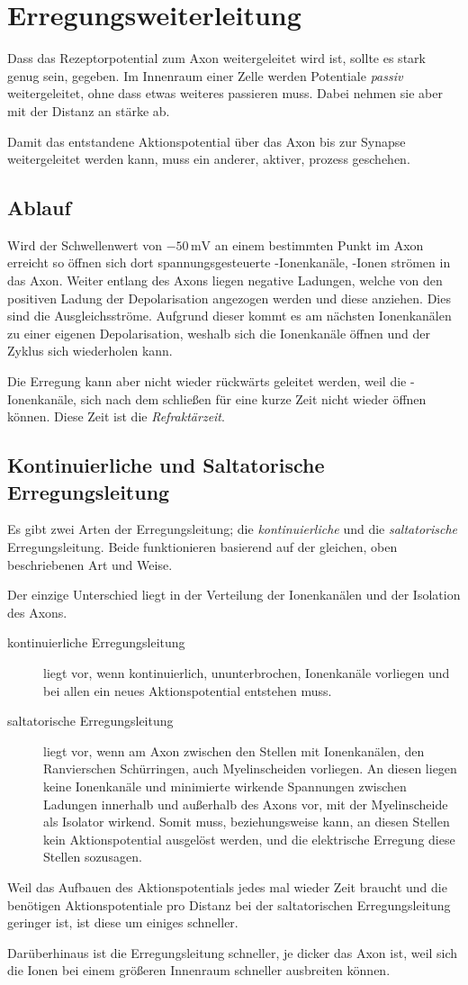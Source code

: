 \documentclass{article}
\begin{document}
 
\section{Erregungsweiterleitung}
Dass das Rezeptorpotential zum Axon weitergeleitet wird ist, sollte es stark genug sein, gegeben. Im Innenraum einer Zelle werden Potentiale \emph{passiv} weitergeleitet, ohne dass etwas weiteres passieren muss. Dabei nehmen sie aber mit der Distanz an stärke ab.
 
Damit das entstandene Aktionspotential über das Axon bis zur Synapse weitergeleitet werden kann, muss ein anderer, aktiver, prozess geschehen.
 
\subsection{Ablauf} 
Wird der Schwellenwert von $-50\,\text{mV}$ an einem bestimmten Punkt im Axon erreicht so öffnen sich dort spannungsgesteuerte -Ionenkanäle, -Ionen strömen in das Axon. Weiter entlang des Axons liegen negative Ladungen, welche von den positiven Ladung der Depolarisation angezogen werden und diese anziehen. Dies sind die Ausgleichsströme. Aufgrund dieser kommt es am nächsten Ionenkanälen zu einer eigenen Depolarisation, weshalb sich die Ionenkanäle öffnen und der Zyklus sich wiederholen kann.
 
Die Erregung kann aber nicht wieder rückwärts geleitet werden, weil die -Ionenkanäle, sich nach dem schließen für eine kurze Zeit nicht wieder öffnen können. Diese Zeit ist die \emph{Refraktärzeit}.
 
\subsection{Kontinuierliche und Saltatorische Erregungsleitung}
Es gibt zwei Arten der Erregungsleitung; die \emph{kontinuierliche} und die \emph{saltatorische} Erregungsleitung. Beide funktionieren basierend auf der gleichen, oben beschriebenen Art und Weise.
 
Der einzige Unterschied liegt in der Verteilung der Ionenkanälen und der Isolation des Axons.
\begin{description}
 \item[kontinuierliche Erregungsleitung] liegt vor, wenn kontinuierlich, ununterbrochen, Ionenkanäle vorliegen und bei allen ein neues Aktionspotential entstehen muss.
 \item[saltatorische Erregungsleitung] liegt vor, wenn am Axon zwischen den Stellen mit Ionenkanälen, den Ranvierschen Schürringen, auch Myelinscheiden vorliegen. An diesen liegen keine Ionenkanäle und minimierte wirkende Spannungen zwischen Ladungen innerhalb und außerhalb des Axons vor, mit der Myelinscheide als Isolator wirkend. Somit muss, beziehungsweise kann, an diesen Stellen kein Aktionspotential ausgelöst werden, und die elektrische Erregung  diese Stellen sozusagen.
\end{description} 
Weil das Aufbauen des Aktionspotentials jedes mal wieder Zeit braucht und die benötigen Aktionspotentiale pro Distanz bei der saltatorischen Erregungsleitung geringer ist, ist diese um einiges schneller.
 
Darüberhinaus ist die Erregungsleitung schneller, je dicker das Axon ist, weil sich die Ionen bei einem größeren Innenraum schneller ausbreiten können. 
\end{document}
